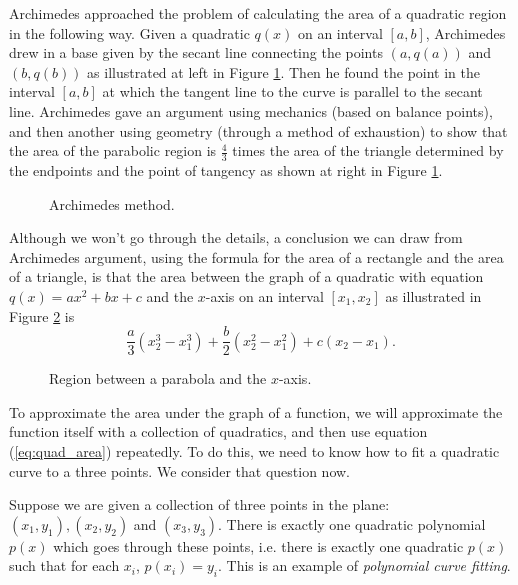 Archimedes approached the problem of calculating the area of a quadratic region in the following way. Given a quadratic $q(x)$ on an interval $[a,b]$, Archimedes drew in a base given by the secant line connecting the points $(a,q(a))$ and $(b,q(b))$ as illustrated at left in Figure \ref{F:1_b_Archimedes}. Then he found the point in the interval $[a,b]$ at which the tangent line to the curve is parallel to the secant line. Archimedes gave an argument using mechanics (based on balance points), and then another using geometry (through a method of exhaustion) to show that the area of the parabolic region is $\frac{4}{3}$ times the area of the triangle determined by the endpoints and the point of tangency as shown at right in Figure \ref{F:1_b_Archimedes}.
\begin{figure}[h]
\begin{center}
 \hspace{0.5in} 
\end{center}
\caption{Archimedes method.}
\label{F:1_b_Archimedes}
\end{figure}
Although we won't go through the details, a conclusion we can draw from Archimedes argument, using the formula for the area of a rectangle and the area of a triangle, is that the area between the graph of a quadratic with equation $q(x) = ax^2+bx+c$ and the $x$-axis on an interval $[x_1, x_2]$ as illustrated in Figure \ref{F:1_b_quad_area} is 
\begin{equation} \label{eq:quad_area}
\frac{a}{3}(x_2^3-x_1^3) + \frac{b}{2}(x_2^2-x_1^2) + c(x_2-x_1).
\end{equation}
\begin{figure}[h]
\begin{center}
\end{center}
\caption{Region between a parabola and the $x$-axis.}
\label{F:1_b_quad_area}
\end{figure}
To approximate the area under the graph of a function, we will approximate the function itself with a collection of quadratics, and then use equation (\ref{eq:quad_area}) repeatedly. To do this, we need to know how to fit a quadratic curve to a three points. We consider that question now.

Suppose we are given a collection of three points in the plane: $(x_1, y_1), (x_2, y_2)$ and $(x_3, y_3)$. There is exactly one quadratic polynomial $p(x)$ which goes through these points, i.e. there is exactly one quadratic $p(x)$ such that for each $x_i$, $p(x_i)=y_i$. This is an example of \emph{polynomial curve fitting}. 


